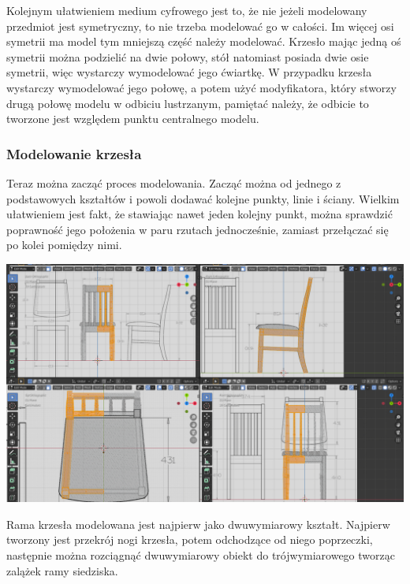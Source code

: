 \documentclass{article} %
\begin{document}
            Kolejnym ułatwieniem medium cyfrowego jest to, że nie jeżeli modelowany przedmiot jest symetryczny, to nie trzeba modelować go w całości. Im więcej osi symetrii ma model tym mniejszą część należy modelować. Krzesło mając jedną oś symetrii można podzielić na dwie połowy, stół natomiast posiada dwie osie symetrii, więc wystarczy wymodelować jego ćwiartkę. W przypadku krzesła wystarczy wymodelować jego połowę, a potem użyć modyfikatora, który stworzy drugą połowę modelu w odbiciu lustrzanym, pamiętać należy, że odbicie to tworzone jest względem punktu centralnego modelu.
            \\
            
            \subsubsection*{Modelowanie krzesła}
            Teraz można zacząć proces modelowania. Zacząć można od jednego z podstawowych kształtów i powoli dodawać kolejne punkty, linie i ściany. Wielkim ułatwieniem jest fakt, że stawiając nawet jeden kolejny punkt, można sprawdzić poprawność jego położenia w paru rzutach jednocześnie, zamiast przełączać się po kolei pomiędzy nimi.
            \\
            
            \begin{center}
            \includegraphics[scale=0.25,keepaspectratio=true]{images/screenshots/work/5-modelowanie-mebli_004.png}
            \end{center}
            
            Rama krzesła modelowana jest najpierw jako dwuwymiarowy kształt. Najpierw tworzony jest przekrój nogi krzesła, potem odchodzące od niego poprzeczki, następnie można rozciągnąć dwuwymiarowy obiekt do trójwymiarowego tworząc zalążek ramy siedziska.
            \\
            
\end{document}
